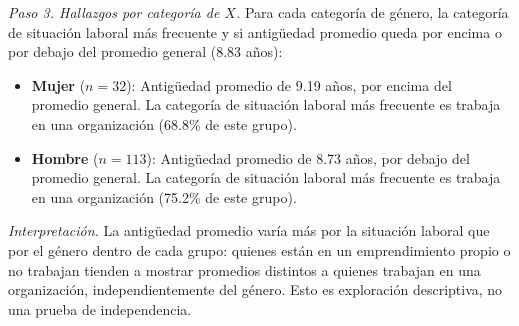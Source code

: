\textit{Paso 3. Hallazgos por categoría de $X$.} Para cada categoría de género, la categoría de situación laboral más frecuente y si antigüedad promedio queda por encima o por debajo del promedio general (8.83 años):

\begin{itemize}
  \item \textbf{Mujer} ($n=32$): Antigüedad promedio de 9.19 años, por encima del promedio general. La categoría de situación laboral más frecuente es trabaja en una organización (68.8\% de este grupo).
  \item \textbf{Hombre} ($n=113$): Antigüedad promedio de 8.73 años, por debajo del promedio general. La categoría de situación laboral más frecuente es trabaja en una organización (75.2\% de este grupo).
\end{itemize}

\textit{Interpretación.} La antigüedad promedio varía más por la situación laboral que por el género dentro de cada grupo: quienes están en un emprendimiento propio o no trabajan tienden a mostrar promedios distintos a quienes trabajan en una organización, independientemente del género. Esto es exploración descriptiva, no una prueba de independencia.

